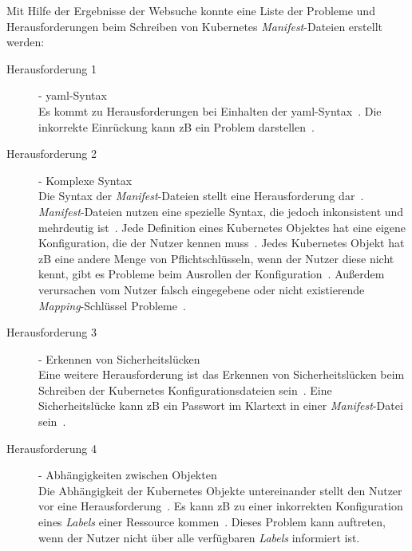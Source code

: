 Mit Hilfe der Ergebnisse der Websuche konnte eine Liste der Probleme und Herausforderungen beim Schreiben von Kubernetes \textit{Manifest}-Dateien erstellt werden:
\begin{description}
    \item[Herausforderung 1]{- \ac{yaml}-Syntax\\}
          Es kommt zu Herausforderungen bei Einhalten der \ac{yaml}-Syntax~\cite{10.1145/3357223.3365759,the-chief-io-kubernetes-challenges,techtarget-kubernetes-challenges,monokle-kubernetes-challenges}.
          Die inkorrekte Einrückung kann \ac{zB} ein Problem darstellen~\cite{10.1145/3357223.3365759,monokle-kubernetes-challenges}.
    \item[Herausforderung 2]{- Komplexe Syntax\\}
          Die Syntax der \textit{Manifest}-Dateien stellt eine Herausforderung dar~\cite{dev-to-kubernetes-challenges,kubetools-io-kubernetes-manifest-management,entwickler-de-kubernetes-problems,newstack-io-kubernetes-manifest-lifecycle,10.1145/3357223.3365759,techtarget-kubernetes-challenges,monokle-kubernetes-challenges,kubernetes-config-problems}.
          \textit{Manifest}-Dateien nutzen eine spezielle Syntax, die jedoch inkonsistent und mehrdeutig ist~\cite{dev-to-kubernetes-challenges}.
          Jede Definition eines Kubernetes Objektes hat eine eigene Konfiguration, die der Nutzer kennen muss~\cite{kubetools-io-kubernetes-manifest-management,entwickler-de-kubernetes-problems}.
          Jedes Kubernetes Objekt hat \ac{zB} eine andere Menge von Pflichtschlüsseln, wenn der Nutzer diese nicht kennt, gibt es Probleme beim Ausrollen der Konfiguration~\cite{10.1145/3357223.3365759, techtarget-kubernetes-challenges}.
          Außerdem verursachen vom Nutzer falsch eingegebene oder nicht existierende \textit{Mapping}-Schlüssel Probleme~\cite{monokle-kubernetes-challenges}.
    \item[Herausforderung 3]{- Erkennen von Sicherheitslücken\\}
          Eine weitere Herausforderung ist das Erkennen von Sicherheitslücken beim Schreiben der Kubernetes Konfigurationsdateien sein~\cite{9476056,dynatrace-kubernetes-security-challenges,10.1145/3468264.3473495,10.1145/3579639}.
          Eine Sicherheitslücke kann \ac{zB} ein Passwort im Klartext in einer \textit{Manifest}-Datei sein~\cite{10.1145/3579639}.
    \item[Herausforderung 4]{- Abhängigkeiten zwischen Objekten\\}
          Die Abhängigkeit der Kubernetes Objekte untereinander stellt den Nutzer vor eine Herausforderung~\cite{dev-to-kubernetes-challenges,kubetools-io-kubernetes-manifest-management,spacelift-io-kubernetes-challenges,qovery-kubernetes-challenges}.
          Es kann \ac{zB} zu einer inkorrekten Konfiguration eines \textit{Labels} einer Ressource kommen~\cite{spacelift-io-kubernetes-challenges,qovery-kubernetes-challenges}.
          Dieses Problem kann auftreten, wenn der Nutzer nicht über alle verfügbaren \textit{Labels} informiert ist.
\end{description}

